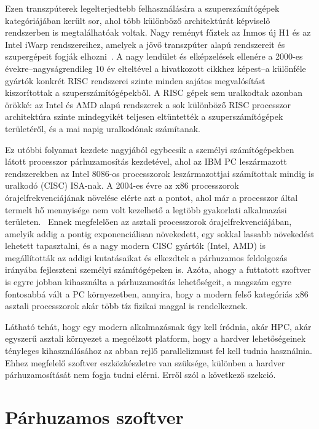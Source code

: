 Ezen transzpúterek legelterjedtebb felhasználására a szuperszámítógépek kategóriájában került sor, ahol több különböző architektúrát képviselő rendszerben is megtalálhatóak voltak.
Nagy reményt fűztek az Inmos új H1 és az Intel iWarp rendszereihez, amelyek a jövő transzpúter alapú rendszereit és szupergépeit fogják elhozni~\cite{hey_supercomputing_1990}. A nagy lendület és elképzelések ellenére \cite{top500org_top500_2024} a 2000-es évekre--nagyságrendileg 10 év elteltével a hivatkozott cikkhez képest--a különféle gyártók konkrét RISC rendszerei szinte minden sajátos megvalósítást kiszorítottak a szuperszámítógépekből.
A RISC gépek sem uralkodtak azonban örökké: az Intel és AMD alapú rendszerek a sok különböző RISC processzor architektúra szinte mindegyikét teljesen eltüntették a szuperszámítógépek területéről, és a mai napig uralkodónak számítanak.

Ez utóbbi folyamat kezdete nagyjából egybeesik a személyi számítógépekben látott processzor párhuzamosítás kezdetével, ahol az IBM PC leszármazott rendszerekben az Intel 8086-os processzorok leszármazottjai számítottak mindig is uralkodó (CISC) ISA-nak.
A 2004-es évre az x86 processzorok órajelfrekvenciájának növelése elérte azt a pontot, ahol már a processzor által termelt hő mennyisége nem volt kezelhető a legtöbb gyakorlati alkalmazási területen.~\cite{national_research_council_future_2011}
Ennek megfelelően az asztali processzorok órajelfrekvenciájában, amelyik addig a pontig exponenciálisan növekedett, \cite[S.1 ábra]{national_research_council_future_2011} egy sokkal lassabb növekedést lehetett tapasztalni, és a nagy modern CISC gyártók (Intel, AMD) is megállították az addigi kutatásaikat \cite{smith_intel_2004} és elkezdtek a párhuzamos feldolgozás irányába fejleszteni személyi számítógépeken is.
Azóta, ahogy a futtatott szoftver is egyre jobban kihasználta a párhuzamosítás lehetőségeit, a magszám egyre fontosabbá vált a PC környezetben, annyira, hogy a modern felső kategóriás x86 asztali processzorok akár több tíz fizikai maggal is rendelkeznek.

Látható tehát, hogy egy modern alkalmazásnak úgy kell íródnia, akár HPC, akár egyszerű asztali környezet a megcélzott platform, hogy a hardver lehetőségeinek tényleges kihasználásához az abban rejlő parallelizmust fel kell tudnia használnia.
Ehhez megfelelő szoftver eszközkészletre van szüksége, különben a hardver párhuzamosítását nem fogja tudni elérni.
Erről szól a következő szekció.

\section{Párhuzamos szoftver}\label{sec:par-sw}

